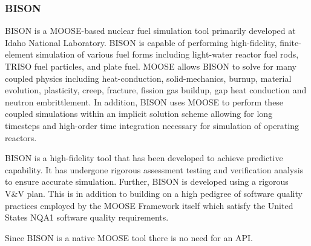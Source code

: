 \subsubsection{BISON}

BISON is a MOOSE-based \cite{hales2013triso} nuclear fuel simulation tool primarily developed at Idaho National Laboratory.
BISON is capable of performing high-fidelity, finite-element simulation of various fuel forms including
light-water reactor fuel rods, TRISO fuel particles, and plate fuel. MOOSE allows BISON to solve for many
coupled physics including heat-conduction, solid-mechanics, burnup, material evolution, plasticity, creep,
fracture, fission gas buildup, gap heat conduction and neutron embrittlement. In addition, BISON uses
MOOSE to perform these coupled simulations within an implicit solution scheme allowing for long timesteps
and high-order time integration necessary for simulation of operating reactors.

BISON is a high-fidelity tool that has been developed to achieve predictive capability. It has undergone
rigorous assessment testing and verification analysis to ensure accurate simulation. Further, BISON is
developed using a rigorous V\&V plan. This is in addition to building on a high pedigree of software quality
practices employed by the MOOSE Framework itself which satisfy the United States NQA1 software quality
requirements.

Since BISON is a native MOOSE tool there is no need for an API.
